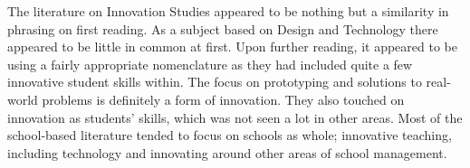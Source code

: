 The literature on Innovation Studies appeared to be nothing but a similarity in phrasing on first reading. As a subject based on Design and Technology there appeared to be little in common at first. Upon further reading, it appeared to be using a fairly appropriate nomenclature as they had included quite a few innovative student skills within. The focus on prototyping and solutions to real-world problems is definitely a form of innovation. They also touched on innovation as students' skills, which was not seen a lot in other areas. Most of the school-based literature tended to focus on schools as whole; innovative teaching, including technology and innovating around other areas of school management. 
